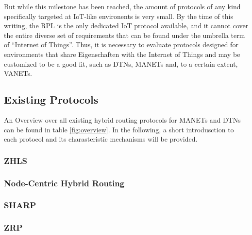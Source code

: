 \documentclass[a4paper,10pt]{scrartcl}
\begin{document}
But while this milestone has been reached, the amount of protocols of any kind specifically targeted at IoT-like environents is very small. By the time of this writing, the \gls{RPL} is the only dedicated IoT protocol available, and it cannot cover the entire diverse set of requirements that can be found under the umbrella term of ``Internet of Things''. Thus, it is necessary to evaluate protocols designed for environments that share Eigenschaften with the Internet of Things and may be customized to be a good fit, such as \glspl{DTN}, \glspl{MANET} and, to a certain extent, \glspl{VANET}.\\

\subsection{Existing Protocols}
\label{subsec:existing_protocols}
An Overview over all existing hybrid routing protocols for \glspl{MANET} and \glspl{DTN} %
can be found in table \ref{fig:overview}. In the following, a short introdusction to each protocol and its charasteristic mechanisms will be provided.

\subsubsection{\gls{ZHLS}}
\label{subsec:sharp}

\subsubsection{Node-Centric Hybrid Routing}
\label{subsec:existing_protocols}

\subsubsection{\gls{SHARP}}
\label{subsec:sharp}

\subsubsection{\gls{ZRP}}
\label{subsec:sharp}
\end{document}
